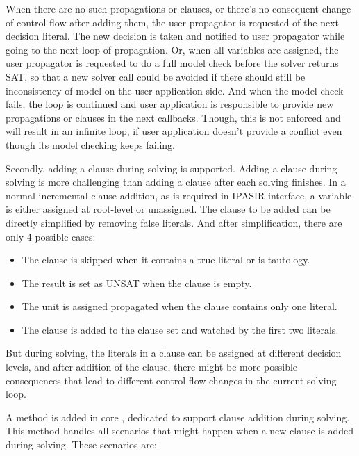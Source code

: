 When there are no such propagations or clauses, or there's no consequent change of control flow after adding them, the user propagator is requested of the next decision literal. The new decision is taken and notified to user propagator while going to the next loop of propagation. Or, when all variables are assigned, the user propagator is requested to do a full model check before the solver returns SAT, so that a new solver call could be avoided if there should still be inconsistency of model on the user application side. And when the model check fails, the loop is continued and user application is responsible to provide new propagations or clauses in the next callbacks. Though, this is not enforced and will result in an infinite loop, if user application doesn't provide a conflict even though its model checking keeps failing.

Secondly, adding a clause during solving is supported. Adding a clause during solving is more challenging than adding a clause after each solving finishes. In a normal incremental clause addition, as is required in IPASIR interface, a variable is either assigned at root-level or unassigned. The clause to be added can be directly simplified by removing false literals. And after simplification, there are only 4 possible cases:

\begin{itemize}
  \item The clause is skipped when it contains a true literal or is tautology.
  \item The result is set as UNSAT when the clause is empty.
  \item The unit is assigned propagated when the clause contains only one literal.
  \item The clause is added to the clause set and watched by the first two literals.
\end{itemize}

But during solving, the literals in a clause can be assigned at different decision levels, and after addition of the clause, there might be more possible consequences that lead to different control flow changes in the current solving loop.

A method  is added in core , dedicated to support clause addition during solving. This method handles all scenarios that might happen when a new clause is added during solving. These scenarios are:

